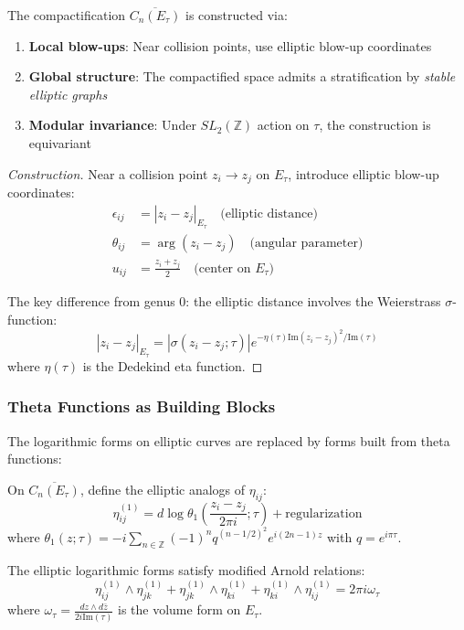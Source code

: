 \begin{theorem}
The compactification $\overline{C_n(E_\tau)}$ is constructed via:
\begin{enumerate}
\item \textbf{Local blow-ups}: Near collision points, use elliptic blow-up coordinates
\item \textbf{Global structure}: The compactified space admits a stratification by \emph{stable elliptic graphs}
\item \textbf{Modular invariance}: Under $SL_2(\mathbb{Z})$ action on $\tau$, the construction is equivariant
\end{enumerate}
\end{theorem}

\begin{proof}[Construction]
Near a collision point $z_i \to z_j$ on $E_\tau$, introduce elliptic blow-up coordinates:
\begin{align}
\epsilon_{ij} &= |z_i - z_j|_{E_\tau} \quad \text{(elliptic distance)} \\
\theta_{ij} &= \arg(z_i - z_j) \quad \text{(angular parameter)} \\
u_{ij} &= \frac{z_i + z_j}{2} \quad \text{(center on } E_\tau)
\end{align}

The key difference from genus 0: the elliptic distance involves the Weierstrass $\sigma$-function:
\[
|z_i - z_j|_{E_\tau} = |\sigma(z_i - z_j; \tau)|e^{-\eta(\tau)\text{Im}(z_i - z_j)^2/\text{Im}(\tau)}
\]
where $\eta(\tau)$ is the Dedekind eta function.
\end{proof}

\subsubsection{Theta Functions as Building Blocks}

The logarithmic forms on elliptic curves are replaced by forms built from theta functions:

\begin{definition}
On $\overline{C_n(E_\tau)}$, define the elliptic analogs of $\eta_{ij}$:
\[
\eta_{ij}^{(1)} = d\log\theta_1\left(\frac{z_i - z_j}{2\pi i}; \tau\right) + \text{regularization}
\]
where $\theta_1(z; \tau) = -i\sum_{n \in \mathbb{Z}}(-1)^n q^{(n-1/2)^2}e^{i(2n-1)z}$ with $q = e^{i\pi\tau}$.
\end{definition}

\begin{proposition}
The elliptic logarithmic forms satisfy modified Arnold relations:
\[
\eta_{ij}^{(1)} \wedge \eta_{jk}^{(1)} + \eta_{jk}^{(1)} \wedge \eta_{ki}^{(1)} + \eta_{ki}^{(1)} \wedge \eta_{ij}^{(1)} = 2\pi i \omega_\tau
\]
where $\omega_\tau = \frac{dz \wedge d\bar{z}}{2i\text{Im}(\tau)}$ is the volume form on $E_\tau$.
\end{proposition}


